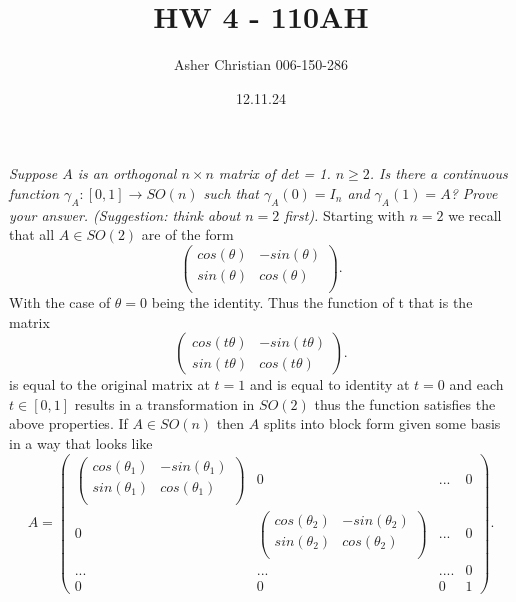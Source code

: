 \documentclass{article}
\title{HW 4 - 110AH}
\author{Asher Christian 006-150-286}
\date{ 12.11.24}
\begin{document}
    \maketitle
    \section{}
    \emph{Suppose $A$ is an orthogonal $n \times n$ matrix of det = 1. $n \ge 2$. Is
        there a continuous function $\gamma_A : [0,1] \rightarrow SO(n)$ such that $ \gamma_A(0) = I_n$ and $\gamma_A(1) = A$?
        Prove your answer. (Suggestion: think about  $n = 2$ first).
    }
    Starting with $n=2$ we recall that all $A \in SO(2)$ are of the form
    \[
    \begin{pmatrix} %
    cos(\theta) & -sin(\theta) \\
    sin(\theta) & cos(\theta ) \\
    \end{pmatrix}
    .\] 
    With the case of $\theta = 0$ being the identity. Thus the function of t that is the matrix
    \[
    \begin{pmatrix}
        cos(t \theta ) & -sin(t \theta )\\
        sin(t \theta ) & cos( t \theta )
    \end{pmatrix}
    .\] 
    is equal to the original matrix at $t=1$ and is equal to identity at $t=0$ and each $t \in [0,1]$ results in a
    transformation in $SO(2)$ thus the function satisfies the above properties.
    If $A \in SO(n)$ then $A$ splits into block form given some basis in a way that looks like
    \[
    A =
    \begin{pmatrix}
        \begin{pmatrix}
            cos(\theta_1) & -sin(\theta_1) \\
            sin(\theta_1) & cos(\theta_1 ) \\
        \end{pmatrix} & 0 & ... & 0\\
        0 & 
        \begin{pmatrix}
            cos(\theta_2) & -sin(\theta_2) \\
            sin(\theta_2) & cos(\theta_2 ) \\
        \end{pmatrix} & ... & 0\\ 
        ... & ... & .... & 0\\
        0 & 0 & 0 & 1

    \end{pmatrix} 
    .\]
\end{document}
